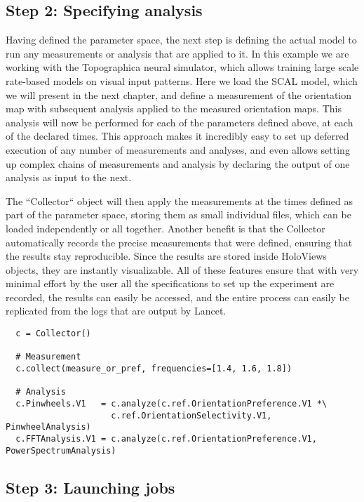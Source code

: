 \subsection{Step 2: Specifying analysis}

Having defined the parameter space, the next step is defining the
actual model to run any measurements or analysis that are applied
to it. In this example we are working with the Topographica neural
simulator, which allows training large scale rate-based models on
visual input patterns. Here we load the SCAL model, which we will
present in the next chapter, and define a measurement of the
orientation map with subsequent analysis applied to the measured orientation
maps. This analysis will now be performed for each of the parameters
defined above, at each of the declared times. This approach makes it incredibly
easy to set up deferred execution of any number of measurements and
analyses, and even allows setting up complex chains of measurements and
analysis by declaring the output of one analysis as input to the next.

The ``Collector`` object will then apply the measurements at the times
defined as part of the parameter space, storing them as small
individual files, which can be loaded independently or all
together. Another benefit is that the Collector automatically records
the precise measurements that were defined, ensuring that the results
stay reproducible. Since the results are stored inside HoloViews
objects, they are instantly visualizable. All of these features ensure
that with very minimal effort by the user all the specifications to
set up the experiment are recorded, the results can easily be accessed,
and the entire process can easily be replicated from the logs that are
output by Lancet.


\begin{minipage}{\linewidth}
\begin{lstlisting}
  c = Collector()

  # Measurement
  c.collect(measure_or_pref, frequencies=[1.4, 1.6, 1.8])

  # Analysis
  c.Pinwheels.V1   = c.analyze(c.ref.OrientationPreference.V1 *\
                     c.ref.OrientationSelectivity.V1, PinwheelAnalysis)
  c.FFTAnalysis.V1 = c.analyze(c.ref.OrientationPreference.V1, PowerSpectrumAnalysis)
\end{lstlisting}
\end{minipage}

\subsection{Step 3: Launching jobs}

